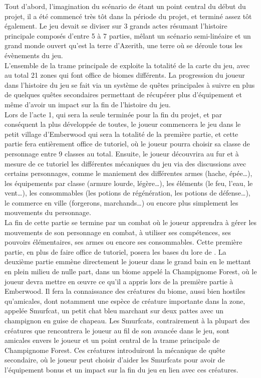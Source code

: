 
Tout d'abord, l'imagination du scénario de \gameName étant un point central du début du projet, il a été commencé très tôt dans la période du projet, et terminé assez tôt également. Le jeu devait se diviser sur 3 grands actes résumant l'histoire principale composés d'entre 5 à 7 parties, mêlant un scénario semi-linéaire et un grand monde ouvert qu'est la terre d'Azerith, une terre où se déroule tous les évènements du jeu.
\\

L'ensemble de la trame principale de \gameName exploite la totalité de la carte du jeu, avec au total 21 zones qui font office de biomes différents. La progression du joueur dans l'histoire du jeu se fait via un système de quêtes principales à suivre en plus de quelques quêtes secondaires permettant de récupérer plus d'équipement et même d'avoir un impact sur la fin de l'histoire du jeu.
\\

Lors de l'acte 1, qui sera la seule terminée pour la fin du projet, et par conséquent la plus développée de toutes, le joueur commencera le jeu dans le petit village d'Emberwood qui sera la totalité de la première partie, et cette partie fera entièrement office de tutoriel, où le joueur pourra choisir sa classe de personnage entre 9 classes au total. Ensuite, le joueur découvrira au fur et à mesure de ce tutoriel les différentes mécaniques du jeu via des discussions avec certains personnages, comme le maniement des différentes armes (hache, épée…), les équipements par classe (armure lourde, légère…), les éléments (le feu, l'eau, le vent…), les consommables (les potions de régénération, les potions de défense…), le commerce en ville (forgerons, marchands…) ou encore plus simplement les mouvements du personnage.
\\

La fin de cette partie se termine par un combat où le joueur apprendra à gérer les mouvements de son personnage en combat, à utiliser ses compétences, ses pouvoirs élémentaires, ses armes ou encore ses consommables. Cette première partie, en plus de faire office de tutoriel, posera les bases du lore de \gameName.
La deuxième partie emmène directement le joueur dans le grand bain en le mettant en plein milieu de nulle part, dans un biome appelé la Champignome Forest, où le joueur devra mettre en œuvre ce qu'il a appris lors de la première partie à Emberwood. Il fera la connaissance des créatures du biome, aussi bien hostiles qu'amicales, dont notamment une espèce de créature importante dans la zone, appelée Smurfcat, un petit chat bleu marchant sur deux pattes avec un champignon en guise de chapeau. Les Smurfcats, contrairement à la plupart des créatures que rencontrera le joueur au fil de son avancée dans le jeu, sont amicales envers le joueur et un point central de la trame principale de Champignome Forest. Ces créatures introduiront la mécanique de quête secondaire, où le joueur peut choisir d'aider les Smurfcats pour avoir de l'équipement bonus et un impact sur la fin du jeu en lien avec ces créatures.
\\

